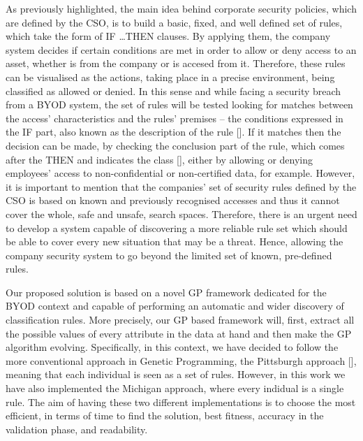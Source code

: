 As previously highlighted, the main idea behind corporate security
policies, which are defined by the CSO, is to build a basic, fixed,
and well defined set of rules, which take the form of \textsc{IF
  \ldots THEN} clauses. By applying them, the company system decides if certain conditions are met in order to allow or
deny access to an asset, whether is from the company or is accesed from it. 
Therefore, these rules can be visualised as the actions, taking place in a precise environment, being classified as
allowed or denied. In this sense and while facing a security breach
from a BYOD system, the set of rules will be tested looking for
matches between the access' characteristics and the rules' premises --
the conditions expressed in the IF part, also known as the description
of the rule [\cite{DeFalco2002257}]. If it matches then the decision can
be made, by checking the conclusion part of the rule, which comes
after the THEN and indicates the class [\cite{DeFalco2002257}], either
by allowing or denying employees' access to non-confidential
 or non-certified data, for example. However, it is important to
 mention that the companies'  set of security rules defined by the CSO is
 based on known and previously recognised accesses and thus it cannot
 cover the whole, safe and unsafe, search spaces. Therefore,
 there is an urgent need to develop a system capable of discovering a
 more reliable rule set which should be able to cover every new
 situation that may be a threat. Hence, allowing the company security
 system to go beyond the limited set of known, pre-defined rules.  %

Our proposed solution is based on a novel GP framework dedicated for
the BYOD context and capable of performing an automatic and wider discovery of classification rules. More precisely, our GP based framework will, first, extract all the possible values of every attribute in the data at hand and then make the GP algorithm evolving. 
Specifically, in this context, we have decided to follow the more
conventional approach in Genetic Programming, the Pittsburgh approach
[\cite{freitas2002data}], meaning that each individual is seen as a set
of rules. However, in this work we have also implemented the Michigan
approach, where every indidual is a single rule. The aim of having these two different implementations is to choose the most efficient, in terms of time to find the solution, best fitness, accuracy in the validation phase, and readability.

